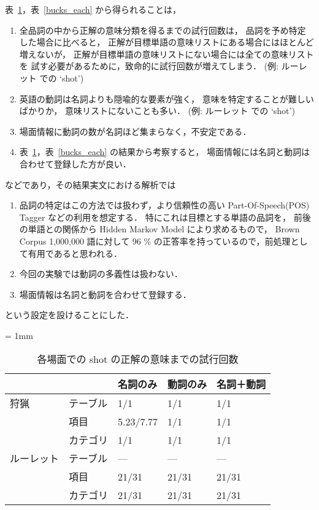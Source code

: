 表~\ref{shot_each}，表~\ref{bucks_each} から得られることは，
\begin{enumerate}
  \item 全品詞の中から正解の意味分類を得るまでの試行回数は，
    品詞を予め特定した場合に比べると，
    正解が目標単語の意味リストにある場合にはほとんど増えないが，
    正解が目標単語の意味リストにない場合には全ての意味リストを
    試す必要があるために，致命的に試行回数が増えてしまう．
    (例: ルーレット での `shot')
  \item 英語の動詞は名詞よりも隠喩的な要素が強く，
    意味を特定することが難しいばかりか，
    意味リストにないことも多い．
    (例: ルーレット での `shot')
  \item 場面情報に動詞の数が名詞ほど集まらなく，不安定である．
  \item 表~\ref{shot_each}，表~\ref{bucks_each} の結果から考察すると，
        場面情報には名詞と動詞は合わせて登録した方が良い．
\end{enumerate}
などであり，その結果実文における解析では
\begin{enumerate}
  \item 品詞の特定はこの方法では扱わず，より信頼性の高い Part-Of-Speech(POS)
    Tagger\cite{XEROX}
    などの利用を想定する．
    特にこれは目標とする単語の品詞を，
    前後の単語との関係から Hidden Markov Model
    により求めるもので， Brown Corpus 1,000,000 語に対して 96 \%
    の正答率を持っているので，前処理として有用であると思われる．
  \item 今回の実験では動詞の多義性は扱わない．
  \item 場面情報は名詞と動詞を合わせて登録する．
\end{enumerate}
という設定を設けることにした．

\small
\begin{table}
  \caption{各場面での shot の正解の意味までの試行回数}
  \label{shot_each}
  \begin{center}
    \tabcolsep = 1mm
    \begin{tabular}{|l|l|l|l|l|} \hline
           &       & 名詞のみ  & 動詞のみ   & 名詞＋動詞 \\ \hline \hline
狩猟       & テーブル & 1/1       & 1/1   & 1/1   \\
           & 項目     & 5.23/7.77 & 1/1   & 1/1   \\
           & カテゴリ & 1/1       & 1/1   & 1/1  \\ \hline
ルーレット & テーブル & ---       & ---   & ---      \\
           & 項目     & 21/31     & 21/31 & 21/31      \\
           & カテゴリ & 21/31     & 21/31 & 21/31      \\ \hline
    \end{tabular}
  \end{center}
\end{table}
\normalsize


